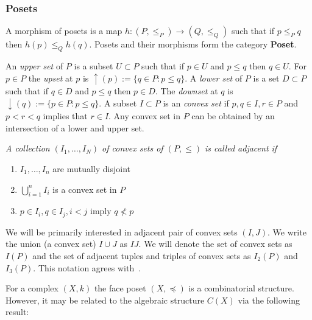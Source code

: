 \subsubsection{Posets}

A morphism of posets is a map $h:(P,\leq_P)\to (Q,\leq_Q)$ such that if $p\leq_P q$ then $h(p)\leq_Q h(q)$. Posets and their morphisms form the category {\bf Poset}.

 An {\em upper set} of $P$ is a subset $U\subset P$ such that if $p\in U$ and $p\leq q$ then $q\in U$.  For $p\in P$ the {\em upset} at $p$ is $\uparrow(p):=\{q\in P:p \leq q\}$.  A {\em lower set} of $P$ is a set $D\subset P$ such that if $q\in D$ and $p\leq q$ then $p\in D$.  The {\em downset} at $q$ is $\downarrow(q):=\{p\in P: p \leq q\}$.  A subset $I\subset P$ is an {\em convex set} if $p,q\in I, r\in P$ and $ p < r < q$ implies that $r\in I$.  Any convex set in $P$ can be obtained by an intersection of a lower and upper set.  
 
\begin{defn}
{\em
A collection $(I_1,\ldots, I_N)$ of convex sets of $(P,\leq)$ is called {\em adjacent} if
\begin{enumerate}
\item $I_1,\ldots,I_n$ are mutually disjoint
\item $\bigcup_{i=1}^n I_i$ is a convex set in $P$
\item $p\in I_i, q\in I_j, i < j$ imply $q \nless p$
\end{enumerate}
}
\end{defn}

We will be primarily interested in adjacent pair of convex sets $(I,J)$.  We write the union (a convex set) $I\cup J$ as $IJ$.  We will denote the set of convex sets as $I(P)$ and the set of adjacent tuples and triples of convex sets as $I_2(P)$ and $I_3(P)$.  This notation agrees with~\cite{fran}.

For a complex $(X,k)$ the face poset $(X,\preceq)$ is a combinatorial structure.  However, it may be related to the algebraic structure $C(X)$ via the following result:

